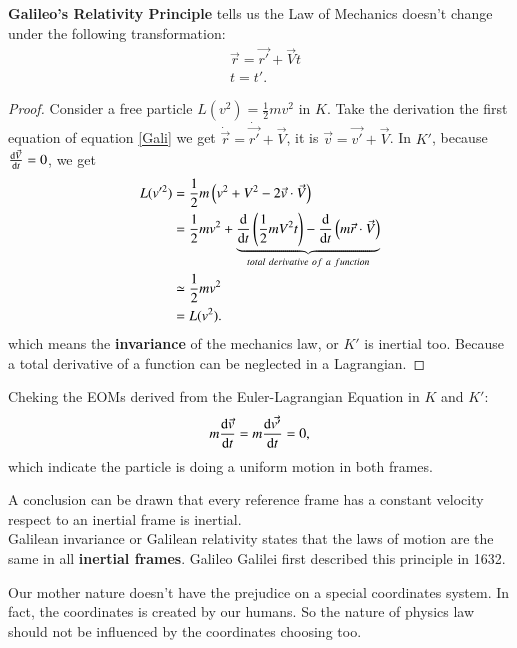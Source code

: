 \documentclass[openany,10pt]{book}
\theoremstyle{definition}
\theoremstyle{definition}
\theoremstyle{remark}
\begin{document}
{\bfseries Galileo's Relativity Principle} tells us the Law of Mechanics doesn't change under the following transformation:
\begin{equation}\label{Gali}
\boxed{
\begin{aligned}
&\vec r=\vec {r'}+\vec V t\\
&t=t'.
\end{aligned}}
\end{equation}


\begin{proof}

Consider a free particle $L(v^2)=\frac12mv^2$ in $K$. Take the derivation the first equation of equation \ref{Gali} we get $\dot {\vec r}=\dot {\vec {r'}}+\vec V$, it is $\vec v=\vec {v'} + \vec V$. In $K'$, because $\frac{{\rm d}\vec V}{{\rm d}t}=0$, we get
\begin{equation}
\begin{aligned}
L(v'^2)&=\frac12 m \left(v^2+V^2-2\vec v\cdot \vec V\right)\\
&=\frac12mv^2+\underbrace{\frac{\rm {d}}{{\rm d}t}\left(\frac12m V^2 t\right)-\frac{\rm {d}}{{\rm d}t}\left(m \vec r\cdot \vec V\right)}_{total \ derivative \ of \ a \ function}\\
&\simeq \frac12 mv^2\\
&= L(v^2).
\end{aligned}
\end{equation}
which means the \textbf{invariance} of the mechanics law, or $K'$ is inertial too. Because a total derivative of a function can be neglected in a Lagrangian. 
\end{proof}

Cheking the EOMs derived from the Euler-Lagrangian Equation in $K$ and $K'$:
\begin{equation}
    m\frac{{\rm d}\vec{v}}{{\rm d}t}=m\frac{{\rm d}\vec{v'}}{{\rm d}t}=0,
\end{equation}
which indicate the particle is doing a uniform motion in both frames.

A conclusion can be drawn that every reference frame has a constant velocity respect to an inertial frame is inertial. \\
Galilean invariance or Galilean relativity states that the laws of motion are the same in all \textbf{inertial frames}. Galileo Galilei first described this principle in 1632.

Our mother nature doesn't have the prejudice on a special coordinates system. In fact, the coordinates is created by our humans. So the nature of physics law should not be influenced by the coordinates choosing too.
\end{document}
